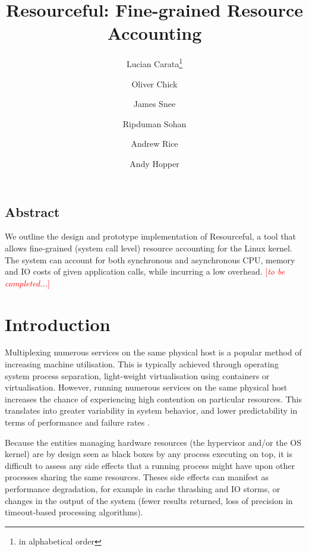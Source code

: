 \documentclass[letterpaper,twocolumn,10pt]{article}
\newcommand{\pname}{Resourceful}
\newcommand{\lnote}[1]{\textcolor{red}{[\textit{#1}]}} %
\newcommand*\aorder[1][\value{footnote}]{\footnotemark[#1]}
\begin{document}
\date{}

\title{\Large \bf \pname: Fine-grained Resource Accounting}

\author{Lucian Carata\thanks{in alphabetical order}\aorder} \author{Oliver
Chick\aorder} \author{James Snee\aorder} \author{\authorcr{}Ripduman Sohan}
\author{Andrew Rice} \author{Andy Hopper} 

\maketitle

\thispagestyle{empty}


\subsection*{Abstract} We outline the design and prototype implementation of
\pname, a tool that allows fine-grained (system call level) resource accounting
for the Linux kernel. The system can account for both synchronous and
asynchronous CPU, memory and IO costs of given application calls, while
incurring a low overhead. \lnote{to be completed...}

\section{Introduction} 
Multiplexing numerous services on the same physical host is a popular method of
increasing machine utilisation. This is typically achieved through operating
system process separation, light-weight virtualisation using containers or
virtualisation. However, running numerous services on the same physical host
increases the chance of experiencing high contention on particular resources.
This translates into greater variability in system behavior, and lower
predictability in terms of performance and failure rates \cite{?}.

Because the entities managing hardware resources (the hypervisor and/or the OS
kernel) are by design seen as black boxes by any process executing on top, it is
difficult to assess any side effects that a running process might have upon
other processes sharing the same resources. Theses side effects can manifest as
performance degradation, for example in cache thrashing and IO storms, or
changes in the output of the system (fewer results returned, loss of precision
in timeout-based processing algorithms).
\end{document}
